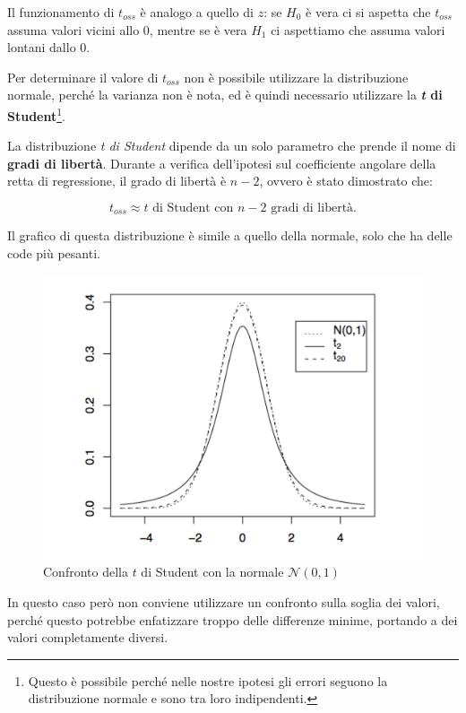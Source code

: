 Il funzionamento di $ t_{oss} $ è analogo a quello di $ z $: se $ H_0 $ è vera ci si aspetta che $ t_{oss} $ assuma valori vicini allo 0, mentre se è vera $ H_1 $ ci aspettiamo che assuma valori lontani dallo 0.

Per determinare il valore di $ t_{oss} $ non è possibile utilizzare la distribuzione normale, perché la varianza non è nota, ed è quindi necessario utilizzare la \textbf{\textit{t} di Student}\footnote{Questo è possibile perché nelle nostre ipotesi gli errori seguono la distribuzione normale e sono tra loro indipendenti.}.

La distribuzione \emph{t di Student} dipende da un solo parametro che
prende il nome di \textbf{gradi di libertà}. Durante a verifica
dell'ipotesi sul coefficiente angolare della retta di regressione, il
grado di libertà è $n-2$, ovvero è stato dimostrato che:

$$
t_{oss} \approx t \text{ di Student con } n - 2 \text{ gradi di libertà.}
$$

Il grafico di questa distribuzione è simile a quello della normale, solo
che ha delle code più pesanti.

\begin{figure}[htbp]
\centering
\includegraphics{./notes/immagini/l6-fig5.png}
\caption{Confronto della $ t $ di Student con la normale $ \mathcal{N}(0,1) $}
\end{figure}

In questo caso però non conviene utilizzare un confronto sulla soglia dei valori, perché questo potrebbe enfatizzare troppo delle differenze minime, portando a dei valori completamente diversi.

